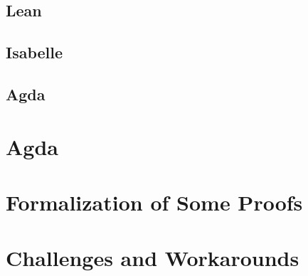 \documentclass[12pt]{article}
\begin{document}
\subsection{Lean}

\subsection{Isabelle}

\subsection{Agda}


\section{ Agda}


\section{Formalization of Some Proofs}



\section{Challenges and Workarounds}





 

\end{document}
